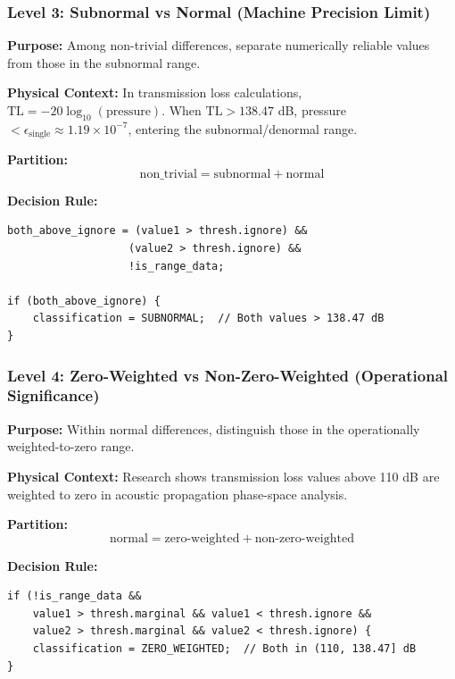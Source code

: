 \documentclass[11pt,letterpaper]{article}
\begin{document}
\subsubsection{Level 3: Subnormal vs Normal (Machine Precision Limit)}

\textbf{Purpose:} Among non-trivial differences, separate numerically reliable values from those in the subnormal range.

\textbf{Physical Context:} In transmission loss calculations, $\text{TL} = -20 \log_{10}(\text{pressure})$. When $\text{TL} > 138.47$ dB, pressure $< \epsilon_{\text{single}} \approx 1.19 \times 10^{-7}$, entering the subnormal/denormal range.

\textbf{Partition:}
\begin{equation}
    \text{non\_trivial} = \text{subnormal} + \text{normal}
\end{equation}

\textbf{Decision Rule:}
\begin{verbatim}
both_above_ignore = (value1 > thresh.ignore) &&
                   (value2 > thresh.ignore) &&
                   !is_range_data;

if (both_above_ignore) {
    classification = SUBNORMAL;  // Both values > 138.47 dB
}
\end{verbatim}

\subsubsection{Level 4: Zero-Weighted vs Non-Zero-Weighted (Operational Significance)}

\textbf{Purpose:} Within normal differences, distinguish those in the operationally weighted-to-zero range.

\textbf{Physical Context:} Research \cite{fabre2009} shows transmission loss values above 110 dB are weighted to zero in acoustic propagation phase-space analysis.

\textbf{Partition:}
\begin{equation}
    \text{normal} = \text{zero-weighted} + \text{non-zero-weighted}
\end{equation}

\textbf{Decision Rule:}
\begin{verbatim}
if (!is_range_data &&
    value1 > thresh.marginal && value1 < thresh.ignore &&
    value2 > thresh.marginal && value2 < thresh.ignore) {
    classification = ZERO_WEIGHTED;  // Both in (110, 138.47] dB
}
\end{verbatim}
\end{document}
